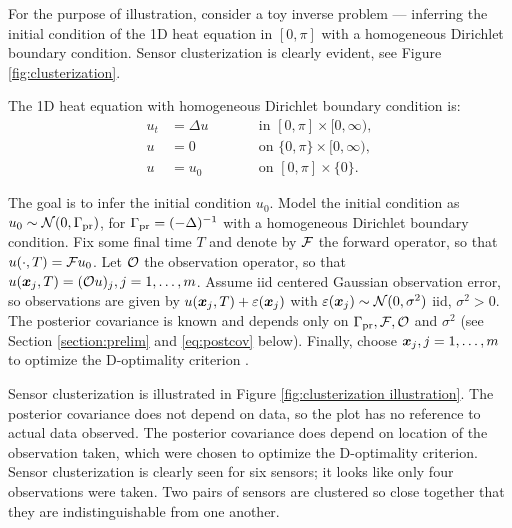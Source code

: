 For the purpose of illustration, consider a toy inverse problem ---
inferring the initial condition of the 1D heat equation in $[0,\pi]$
with a homogeneous Dirichlet boundary condition. Sensor clusterization
is clearly evident, see Figure \ref{fig:clusterization}.

The 1D heat equation with homogeneous Dirichlet boundary condition is:
\begin{subequations}\label{eq:heat equation}
  \begin{alignat}{2}
    u_t &= \Delta u &&\qquad \text{in } [0,\pi] \times [0,\infty),\\
      u &= 0 &&\qquad \text{on } \{0, \pi\} \times [0,\infty),\\
        u &= u_0 &&\qquad \text{on }[0,\pi] \times \{0\}.
  \end{alignat}
\end{subequations}


The goal is to infer the initial condition $u_0$. Model the initial
condition as $u_0 \sim \mathcal{N}(0,\Gamma_{\textup{pr}})$, for $\Gamma_{\textup{pr}} =
(-\Delta)^{-1}$ with a homogeneous Dirichlet boundary condition. Fix
some final time $T$ and denote by $\mathcal{F}$ the forward operator, so that
$u(\cdot, T) = \mathcal{F} u_0$. Let $\mathcal{O}$ the observation operator, so that
$u({\boldsymbol{x}}_j,T) = (\mathcal{O} u)_j, j=1,\dots,m$. Assume iid centered Gaussian
observation error, so observations are given by $u({\boldsymbol{x}}_j,T) +
\varepsilon({\boldsymbol{x}}_j)$ with $\varepsilon({\boldsymbol{x}}_j) \sim \mathcal{N}(0, \sigma^2)$ iid, $\sigma^2
> 0$. The posterior covariance is known and depends only on $\Gamma_{\textup{pr}},
\mathcal{F}, \mathcal{O}$ and $\sigma^2$ \cite{Stuart10} (see Section
\ref{section:prelim} and \eqref{eq:postcov} below). Finally, choose
${\boldsymbol{x}}_j,j=1,\dots,m$ to optimize the D-optimality criterion
\cite{AlexanderianGloorGhattas14}.

Sensor clusterization is illustrated in Figure \ref{fig:clusterization
  illustration}. The posterior covariance does not depend on data, so
the plot has no reference to actual data observed. The posterior
covariance does depend on location of the observation taken, which
were chosen to optimize the D-optimality criterion. Sensor
clusterization is clearly seen for six sensors; it looks like only
four observations were taken. Two pairs of sensors are clustered so
close together that they are indistinguishable from one another.


